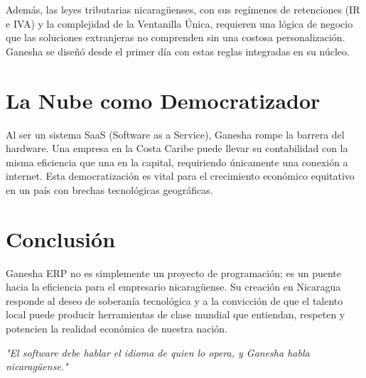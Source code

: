 \documentclass[12pt]{article}
\begin{document}
Además, las leyes tributarias nicaragüenses, con sus regímenes de retenciones (IR e IVA) y la complejidad de la Ventanilla Única, requieren una lógica de negocio que las soluciones extranjeras no comprenden sin una costosa personalización. Ganesha se diseñó desde el primer día con estas reglas integradas en su núcleo.

\section{La Nube como Democratizador}
Al ser un sistema SaaS (Software as a Service), Ganesha rompe la barrera del hardware. Una empresa en la Costa Caribe puede llevar su contabilidad con la misma eficiencia que una en la capital, requiriendo únicamente una conexión a internet. Esta democratización es vital para el crecimiento económico equitativo en un país con brechas tecnológicas geográficas.

\section{Conclusión}
Ganesha ERP no es simplemente un proyecto de programación; es un puente hacia la eficiencia para el empresario nicaragüense. Su creación en Nicaragua responde al deseo de soberanía tecnológica y a la convicción de que el talento local puede producir herramientas de clase mundial que entiendan, respeten y potencien la realidad económica de nuestra nación.

\vfill
\begin{center}
    \textit{"El software debe hablar el idioma de quien lo opera, y Ganesha habla nicaragüense."}
\end{center}
\end{document}
